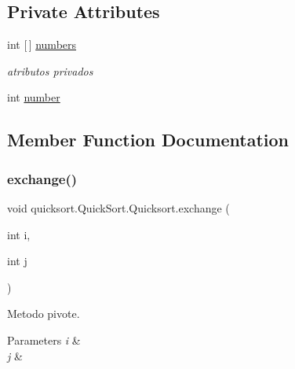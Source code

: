 \subsection*{Private Attributes}
\begin{DoxyCompactItemize}
\item 
int \mbox{[}$\,$\mbox{]} \hyperlink{classquicksort_1_1_quick_sort_1_1_quicksort_aeb7f48cb8d62acde77b12cf78128aced}{numbers}
\begin{DoxyCompactList}\small\item\em atributos privados \end{DoxyCompactList}\item 
int \hyperlink{classquicksort_1_1_quick_sort_1_1_quicksort_a1ccb00d85f76e7150e0746b42038225f}{number}
\end{DoxyCompactItemize}


\subsection{Member Function Documentation}
\hypertarget{classquicksort_1_1_quick_sort_1_1_quicksort_a83169b60ccb0c644794cb7b16d21edd6}{}\label{classquicksort_1_1_quick_sort_1_1_quicksort_a83169b60ccb0c644794cb7b16d21edd6} 
\subsubsection{\texorpdfstring{exchange()}{exchange()}}
{\footnotesize\ttfamily void quicksort.\+Quick\+Sort.\+Quicksort.\+exchange (\begin{DoxyParamCaption}\item[{int}]{i,  }\item[{int}]{j }\end{DoxyParamCaption})\hspace{0.3cm}{\ttfamily [private]}}



Metodo pivote. 


\begin{DoxyParams}{Parameters}
{\em i} & \\
\hline
{\em j} & \\
\hline
\end{DoxyParams}
\hypertarget{classquicksort_1_1_quick_sort_1_1_quicksort_a6790f4b784050741faeed056b58de4ba}{}\label{classquicksort_1_1_quick_sort_1_1_quicksort_a6790f4b784050741faeed056b58de4ba} 
